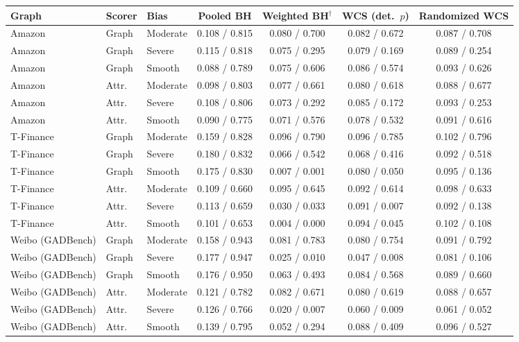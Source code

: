 \begin{tabular}{lllcccc}
\toprule
Graph & Scorer & Bias & Pooled BH & Weighted BH$^\dagger$ & WCS (det.\ $p$) & Randomized WCS\\
\midrule
Amazon & Graph & Moderate & 0.108 / 0.815 & 0.080 / 0.700 & 0.082 / 0.672 & 0.087 / 0.708\\
Amazon & Graph & Severe & 0.115 / 0.818 & 0.075 / 0.295 & 0.079 / 0.169 & 0.089 / 0.254\\
Amazon & Graph & Smooth & 0.088 / 0.789 & 0.075 / 0.606 & 0.086 / 0.574 & 0.093 / 0.626\\
Amazon & Attr. & Moderate & 0.098 / 0.803 & 0.077 / 0.661 & 0.080 / 0.618 & 0.088 / 0.677\\
Amazon & Attr. & Severe & 0.108 / 0.806 & 0.073 / 0.292 & 0.085 / 0.172 & 0.093 / 0.253\\
Amazon & Attr. & Smooth & 0.090 / 0.775 & 0.071 / 0.576 & 0.078 / 0.532 & 0.091 / 0.616\\
\midrule
T-Finance & Graph & Moderate & 0.159 / 0.828 & 0.096 / 0.790 & 0.096 / 0.785 & 0.102 / 0.796\\
T-Finance & Graph & Severe & 0.180 / 0.832 & 0.066 / 0.542 & 0.068 / 0.416 & 0.092 / 0.518\\
T-Finance & Graph & Smooth & 0.175 / 0.830 & 0.007 / 0.001 & 0.080 / 0.050 & 0.095 / 0.136\\
T-Finance & Attr. & Moderate & 0.109 / 0.660 & 0.095 / 0.645 & 0.092 / 0.614 & 0.098 / 0.633\\
T-Finance & Attr. & Severe & 0.113 / 0.659 & 0.030 / 0.033 & 0.091 / 0.007 & 0.092 / 0.138\\
T-Finance & Attr. & Smooth & 0.101 / 0.653 & 0.004 / 0.000 & 0.094 / 0.045 & 0.102 / 0.108\\
\midrule
Weibo (GADBench) & Graph & Moderate & 0.158 / 0.943 & 0.081 / 0.783 & 0.080 / 0.754 & 0.091 / 0.792\\
Weibo (GADBench) & Graph & Severe & 0.177 / 0.947 & 0.025 / 0.010 & 0.047 / 0.008 & 0.081 / 0.106\\
Weibo (GADBench) & Graph & Smooth & 0.176 / 0.950 & 0.063 / 0.493 & 0.084 / 0.568 & 0.089 / 0.660\\
Weibo (GADBench) & Attr. & Moderate & 0.121 / 0.782 & 0.082 / 0.671 & 0.080 / 0.619 & 0.088 / 0.657\\
Weibo (GADBench) & Attr. & Severe & 0.126 / 0.766 & 0.020 / 0.007 & 0.060 / 0.009 & 0.061 / 0.052\\
Weibo (GADBench) & Attr. & Smooth & 0.139 / 0.795 & 0.052 / 0.294 & 0.088 / 0.409 & 0.096 / 0.527\\
\bottomrule
\end{tabular}

